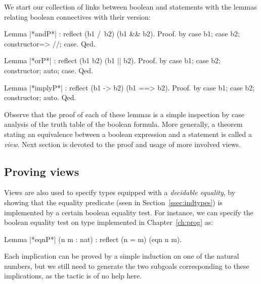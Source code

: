 
We start our collection of links between boolean and 
statements with the lemmas relating boolean connectives with their
 version:

\begin{coq}{}{}
Lemma |*andP*| : reflect (b1 /\ b2) (b1 && b2).
Proof. by case b1; case b2; constructor=> //; case. Qed.

Lemma |*orP*| : reflect (b1 \/ b2) (b1 || b2).
Proof. by case b1; case b2; constructor; auto; case. Qed.

Lemma |*implyP*| : reflect (b1 -> b2) (b1 ==> b2).
Proof. by case b1; case b2; constructor; auto. Qed.
\end{coq}

Observe that the proof of each of these lemmas is a simple inspection by
case analysis of the truth table of the boolean formula. More
generally, a theorem stating an equivalence between a boolean
expression and a  statement is called a \emph{view}. Next
section is devoted to the proof and usage of more involved views.

\subsection{Proving views}

Views are also used to specify types equipped with a
\emph{decidable equality}, by showing that the equality predicate
 (seen in Section~\ref{ssec:indtypes}) is implemented by a
certain boolean equality test. For instance, we can specify the
boolean equality test on type  implemented in
Chapter~\ref{ch:prog} as:

\begin{coq}{}{}
Lemma |*eqnP*| (n m : nat) : reflect (n = m) (eqn n m).
\end{coq}

Each implication can be proved by a simple induction on one of the
natural numbers, but we still need to generate the two subgoals
corresponding to these implications, as the  tactic is of no
help here.


